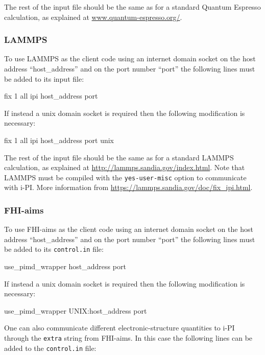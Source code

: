 \documentclass[11pt,english,fleqn]{report}
\newenvironment{code}{%
\footnotesize
\verbatim
}{
\endverbatim
\normalsize
}
\begin{document}
The rest of the input file should be the same as for a standard Quantum
Espresso calculation, as explained at \url{www.quantum-espresso.org/}.

\subsubsection{LAMMPS}

To use LAMMPS as the client code using an
internet domain socket on the host
address {}``host\_address'' and on the port number {}``port''
the following lines must be added to its input file:

\begin{code}
fix  1 all ipi host_address port
\end{code}

If instead a unix domain socket is required then the following
modification is necessary:

\begin{code}
fix 1  all ipi host_address port unix
\end{code}

The rest of the input file should be the same as for a standard LAMMPS
calculation, as explained at \url{http://lammps.sandia.gov/index.html}.
Note that LAMMPS must be compiled with the \texttt{yes-user-misc} option
to communicate with i-PI. More information from \url{https://lammps.sandia.gov/doc/fix_ipi.html}.

\subsubsection{FHI-aims}

To use FHI-aims as the client code using an
internet domain socket on the host
address {}``host\_address'' and on the port number {}``port''
the following lines must be added to its \texttt{control.in} file:

\begin{code}
use_pimd_wrapper host_address port
\end{code}

If instead a unix domain socket is required then the following
modification is necessary:

\begin{code}
use_pimd_wrapper UNIX:host_address port
\end{code}

One can also communicate different electronic-structure quantities to i-PI
through the {\small{\tt extra}} string from FHI-aims. In this case the following lines
can be added to the {\tt control.in} file:
\end{document}
